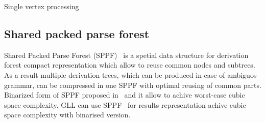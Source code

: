 \documentclass{sig-alternate} %
\begin{document}
\begin{algorithm}[h]
\begin{algorithmic}[1]
\caption{Single vertex processing}
\label{processVertex}
  \Else
  \EndIf
\EndFunction

       \Else 
       \EndIf
       \EndIf
  \EndCase
       \EndFor
  \EndCase
  \EndCase
  \Case{$\_$}
  \EndCase
  \EndSwitch
\EndFunction

      \Else
      \EndIf
  \EndWhile
\EndFunction

\end{algorithmic}
\end{algorithm}

\subsection{Shared packed parse forest}

Shared Packed Parse Forest (SPPF)~\cite{SPPF} is a spetial data structure for derivation forest compact representation which allow to reuse common nodes and subtrees.
As a result multiple derivation trees, which can be produced in case of ambiguos grammar, can be compressed in one SPPF with optimal reusing of common parts.  
Binarized form of SPPF proposed in~\cite{brnglr} and it allow to achive worst-case cubic space complexity.
GLL can use SPPF~\cite{gllParsingTree} for results representation achive cubic space complexity with binarised version.
\end{document}

